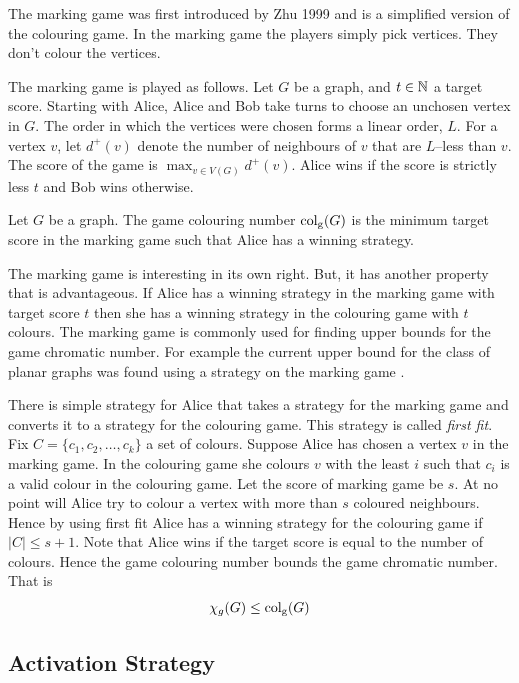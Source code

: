 The marking game was first introduced by Zhu 1999 \cite{Zhu1999} and is a simplified version of the colouring game. In the marking game the players simply pick vertices. They don't colour the vertices. 

The marking game is played as follows. Let $G$ be a graph, and $t\in\mathbb{N}$ a target score. Starting with Alice, Alice and Bob take turns to choose an unchosen vertex in $G$. The order in which the vertices were chosen forms a linear order, $L$. For a vertex $v$, let $d^+(v)$ denote the number of neighbours of $v$ that are $L$--less than $v$. The score of the game is $\max_{v\in V(G)}d^+(v)$. Alice wins if the score is strictly less $t$ and Bob wins otherwise. 
%
\begin{definition}
    Let $G$ be a graph. The game colouring number $\operatorname{col_g}(G)$ is the minimum target score in the marking game such that Alice has a winning strategy. 
\end{definition}
%

The marking game is interesting in its own right. But, it has another property that is advantageous. If Alice has a winning strategy in the marking game with target score $t$ then she has a winning strategy in the colouring game with $t$ colours. The marking game is commonly used for finding upper bounds for the game chromatic number. For example the current upper bound for the class of planar graphs was found using a strategy on the marking game \cite{Zhu2008}.

There is simple strategy for Alice that takes a strategy for the marking game and converts it to a strategy for the colouring game. This strategy is called \textit{first fit}. Fix $C=\{c_1,c_2,\dots,c_k\}$ a set of colours. Suppose Alice has chosen a vertex $v$ in the marking game. In the colouring game she colours $v$ with the least $i$ such that $c_i$ is a valid colour in the colouring game. Let the score of marking game be $s$. At no point will Alice try to colour a vertex with more than $s$ coloured neighbours. Hence by using first fit Alice has a winning strategy for the colouring game if $|C|\leq s+1$. Note that Alice wins if the target score is equal to the number of colours. Hence the game colouring number bounds the game chromatic number. That is 
%
\[\chi_g(G)\leq\operatorname{col_g}(G)\]

\subsection{Activation Strategy}

